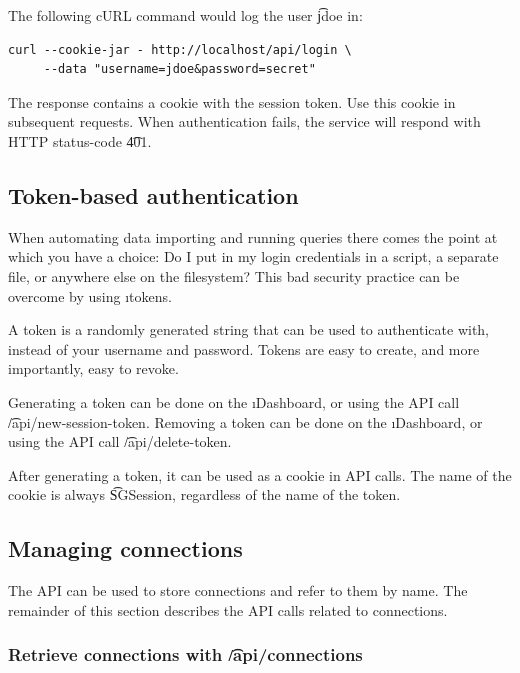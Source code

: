   The following cURL command would log the user \t{jdoe} in:

\begin{siderules}
\begin{verbatim}
curl --cookie-jar - http://localhost/api/login \
     --data "username=jdoe&password=secret"
\end{verbatim}
\end{siderules}

  The response contains a cookie with the session token.  Use this cookie in
  subsequent requests.  When authentication fails, the service will respond
  with HTTP status-code \t{401}.

\subsection{Token-based authentication}
\label{sec:tokens}

  When automating data importing and running queries there comes the point
  at which you have a choice: Do I put in my login credentials in a script,
  a separate file, or anywhere else on the filesystem?  This bad security
  practice can be overcome by using \i{tokens}.

  A token is a randomly generated string that can be used to authenticate
  with, instead of your username and password.  Tokens are easy to create,
  and more importantly, easy to revoke.

  Generating a token can be done on the \i{Dashboard}, or using the API call
  \t{/api/new-session-token}.  Removing a token can be done on the
  \i{Dashboard}, or using the API call \t{/api/delete-token}.

  After generating a token, it can be used as a cookie in API calls.  The name
  of the cookie is always \t{SGSession}, regardless of the name of the
  token.

\subsection{Managing connections}

  The API can be used to store connections and refer to them by name.  The
  remainder of this section describes the API calls related to connections.

\subsubsection{Retrieve connections with \t{/api/connections}}


